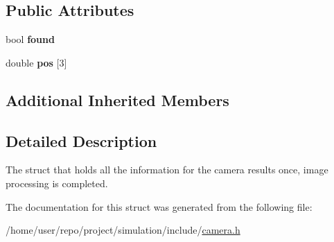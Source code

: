 \subsection*{Public Attributes}
\begin{DoxyCompactItemize}
\item 
\mbox{\label{structCamera_1_1CameraResult_acad6e14dede05ba7da513b5d0c8e146b}} 
bool {\bfseries found}
\item 
\mbox{\label{structCamera_1_1CameraResult_aaa861cab42ce352258a46c49fba5a0d9}} 
double {\bfseries pos} \mbox{[}3\mbox{]}
\end{DoxyCompactItemize}
\subsection*{Additional Inherited Members}


\subsection{Detailed Description}
The struct that holds all the information for the camera results once, image processing is completed. 

The documentation for this struct was generated from the following file\+:\begin{DoxyCompactItemize}
\item 
/home/user/repo/project/simulation/include/\hyperlink{camera_8h}{camera.\+h}\end{DoxyCompactItemize}

